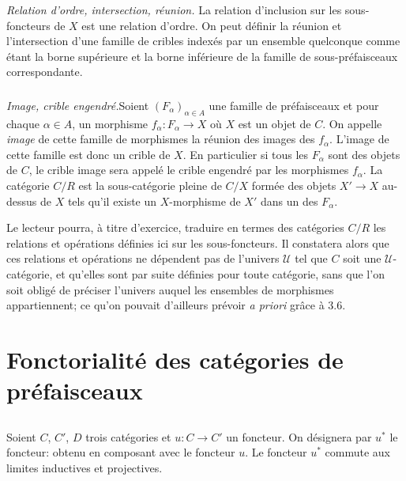 \documentclass[10pt]{../fichiers-configuration-latex/smfart}
\begin{document}
\subsubsection{}
\emph{Relation d'ordre, intersection, réunion.} La relation
d'inclusion sur les sous-foncteurs de $X$ est une relation d'ordre.
On peut définir la réunion et l'intersection d'une famille de
cribles indexés par un ensemble quelconque comme étant la borne
supérieure et la borne inférieure de la famille de sous-préfaisceaux
correspondante.

\subsubsection{}
\emph{Image, crible engendré.}\pageoriginale Soient
$(F_\alpha)_{\alpha\in A}$ une famille de préfaisceaux et pour
chaque $\alpha\in A$, un morphisme $f_\alpha:F_\alpha\rightarrow X$
où $X$ est un objet de $C$. On appelle \emph{image} de cette famille
de morphismes la réunion des images des $f_\alpha$. L'image de cette
famille est donc un crible de $X$. En particulier si tous les
$F_\alpha$ sont des objets de $C$, le crible image sera appelé le
crible engendré par les morphismes $f_\alpha$. La catégorie $C/R$
est la sous-catégorie pleine de $C/X$ formée des objets
$X'\rightarrow X$ au-dessus de $X$ tels qu'il existe un
$X$-morphisme de $X'$ dans un des $F_{\alpha}$.

Le lecteur pourra, à titre d'exercice, traduire en termes des
catégories $C/R$ les relations et opérations définies ici sur les
sous-foncteurs. Il constatera alors que ces relations et opérations
ne dépendent pas de l'univers $𝒰$ tel que $C$ soit une
$𝒰$-catégorie, et qu'elles sont par suite définies pour
toute catégorie, sans que l'on soit obligé de préciser l'univers
auquel les ensembles de morphismes appartiennent; ce qu'on pouvait
d'ailleurs prévoir \textit{a priori} grâce à 3.6.

\section{Fonctorialité des catégories de préfaisceaux}

\setcounter{subsection}{-1}
\subsection{}
Soient $C$, $C'$, $D$ trois catégories et $u:C\rightarrow C'$ un
foncteur. On désignera par $u^\ast$ le foncteur:  obtenu en composant avec le foncteur $u$. Le foncteur
$u^\ast$ commute aux limites inductives et projectives.
\end{document}
